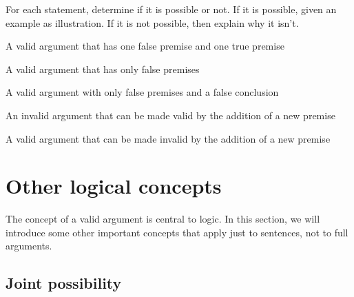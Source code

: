 \problempart
\label{pr.EnglishCombinations}
For each statement, determine if it is possible or not. If it is possible, given an example as illustration. If it is not possible, then explain why it isn't.
	\begin{earg}
		\item A valid argument that has one false premise and one true premise
		\item A valid argument that has only false premises
		\item A valid argument with only false premises and a false conclusion
		\item An invalid argument that can be made valid by the addition of a new premise
		\item A valid argument that can be made invalid by the addition of a new premise
	\end{earg}



\chapter{Other logical concepts}\label{s:BasicNotions}

The concept of a valid argument is central to logic. In this section, we will introduce some other important concepts that apply just to sentences, not to full arguments. 

\section{Joint possibility}\label{s:joint-poss}

